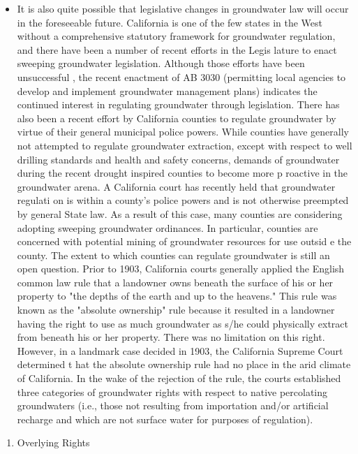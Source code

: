 \documentclass{article}
\begin{document}
\begin{enumerate}
\begin{itemize}
\begin{itemize}
\item It is also quite possible that legislative changes in groundwater law will occur in the foreseeable future. California is one of the few states in the West without a comprehensive statutory framework for groundwater regulation, and there have been a number of recent efforts in the Legis lature to enact sweeping groundwater legislation. Although those efforts have been unsuccessful , the recent enactment of AB 3030 (permitting local agencies to develop and implement groundwater management plans) indicates the continued interest in regulating groundwater through legislation. There has also been a recent effort by California counties to regulate groundwater by virtue of their general municipal police powers. While counties have generally not attempted to regulate groundwater extraction, except with respect to well drilling standards and health and safety concerns, demands of groundwater during the recent drought inspired counties to become more p roactive in the groundwater arena. A California court has recently held that groundwater regulati on is within a county's police powers and is not otherwise preempted by general State law. As a result of this case, many counties are considering adopting sweeping groundwater ordinances. In particular, counties are concerned with potential mining of groundwater resources for use outsid e the county. The extent to which counties can regulate groundwater is still an open question. Prior to 1903, California courts generally applied the English common law rule that a landowner owns beneath the surface of his or her property to "the depths of the earth and up to the heavens." This rule was known as the "absolute ownership" rule because it resulted in a landowner having the right to use as much groundwater as s/he could physically extract from beneath his or her property. There was no limitation on this right. However, in a landmark case decided in 1903, the California Supreme Court determined t hat the absolute ownership rule had no place in the arid climate of California. In the wake of the rejection of the rule, the courts established three categories of groundwater rights with respect to native percolating groundwaters (i.e., those not resulting from importation and/or artificial recharge and which are not surface water for purposes of regulation). 
\end{itemize}
\begin{enumerate}
\item Overlying Rights
\begin{itemize} 

\end{itemize}
\end{enumerate}
\end{itemize}
\end{enumerate}
\end{document}
